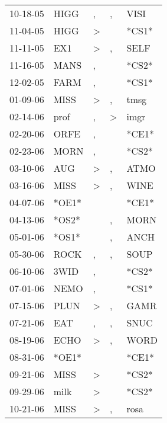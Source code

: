 \begin{supertabular}{lllll}
 10-18-05 &   HIGG &                , &                , &   VISI \\
 11-04-05 &   HIGG &     \textgreater &                  &  *CS1* \\
 11-11-05 &    EX1 &     \textgreater &                , &   SELF \\
 11-16-05 &   MANS &                , &                  &  *CS2* \\
 12-02-05 &   FARM &                , &                  &  *CS1* \\
 01-09-06 &   MISS &     \textgreater &                , &   tmsg \\
 02-14-06 &   prof &                , &     \textgreater &   imgr \\
 02-20-06 &   ORFE &                , &                  &  *CE1* \\
 02-23-06 &   MORN &                , &                  &  *CS2* \\
 03-10-06 &    AUG &     \textgreater &                , &   ATMO \\
 03-16-06 &   MISS &     \textgreater &                , &   WINE \\
 04-07-06 &  *OE1* &                  &                  &  *CE1* \\
 04-13-06 &  *OS2* &                  &                , &   MORN \\
 05-01-06 &  *OS1* &                  &                , &   ANCH \\
 05-30-06 &   ROCK &                , &                , &   SOUP \\
 06-10-06 &   3WID &                , &                  &  *CS2* \\
 07-01-06 &   NEMO &                , &                  &  *CS1* \\
 07-15-06 &   PLUN &     \textgreater &                , &   GAMR \\
 07-21-06 &    EAT &                , &                , &   SNUC \\
 08-19-06 &   ECHO &     \textgreater &                , &   WORD \\
 08-31-06 &  *OE1* &                  &                  &  *CE1* \\
 09-21-06 &   MISS &     \textgreater &                  &  *CS2* \\
 09-29-06 &   milk &     \textgreater &                  &  *CS2* \\
 10-21-06 &   MISS &     \textgreater &                , &   rosa \\

\end{supertabular}
